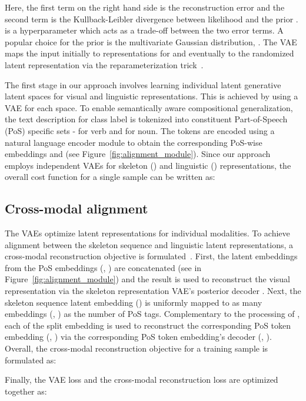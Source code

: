 \documentclass{article}
\begin{document}
Here, the first term on the right hand side is the reconstruction error and the second term is the Kullback-Leibler divergence between likelihood  and the prior .  is a hyperparameter which acts as a trade-off between the two error terms. A popular choice for the prior is the multivariate Gaussian distribution, . The VAE maps the input  initially to representations for  and eventually to the randomized latent representation  via the reparameterization trick~\cite{kingma2013auto}.

The first stage in our approach involves learning individual latent generative latent spaces for visual and linguistic representations. This is achieved by using a VAE for each space. To enable semantically aware compositional generalization, the text description for class label  is tokenized into constituent Part-of-Speech (PoS) specific sets -  for verb and  for noun. The tokens are encoded using a natural language encoder module to obtain the corresponding PoS-wise embeddings  and  (see Figure~\ref{fig:alignment_module}). Since our approach employs independent VAEs for skeleton () and linguistic () representations, the overall cost function for a single sample can be written as:



\subsection{Cross-modal alignment} 

The VAEs optimize latent representations for individual modalities. To achieve alignment between the skeleton sequence and linguistic latent representations, a cross-modal reconstruction objective is formulated~\cite{schonfeld2019generalized}. First, the latent embeddings from the PoS embeddings (, ) are concatenated (see  in Figure~\ref{fig:alignment_module}) and the result  is used to reconstruct the visual representation via the skeleton representation VAE's posterior decoder . Next, the skeleton sequence latent embedding () is uniformly mapped to as many embeddings (, ) as the number of PoS tags. Complementary to the processing of , each of the split embedding is used to reconstruct the corresponding PoS token embedding (, ) via the corresponding PoS token embedding's decoder (, ). Overall, the cross-modal reconstruction objective for a training sample is formulated as:



Finally, the VAE loss and the cross-modal reconstruction loss are optimized together as: 
\end{document}
